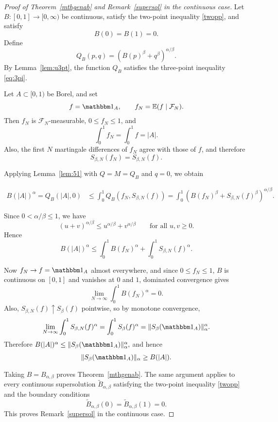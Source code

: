 \documentclass[11pt]{amsart}
\theoremstyle{definition}
\renewcommand{\1}{{\mathbbm{1}}}
\begin{document}
\begin{proof}[Proof of Theorem~\ref{mthgenab} and Remark~\ref{supersol} in the continuous case]
Let $B:[0,1]\to[0,\infty)$ be continuous, satisfy the two-point
inequality \eqref{twopp}, and satisfy
\[
B(0)=B(1)=0.
\]
Define
\[
Q_B(p,q)=\left(B(p)^\beta+q^\beta\right)^{\alpha/\beta}.
\]
By Lemma~\ref{lem:u3pt}, the function $Q_B$ satisfies the three-point
inequality \eqref{eq:3pi}.

Let $A\subset{[0,1)}$ be Borel, and set
\[
f=\mathbbm 1_A,
\qquad
f_N=\mathbb E(f\mid\mathcal F_N).
\]
Then $f_N$ is $\mathcal F_N$-measurable, $0\le f_N\le1$, and
\[
\int_0^1 f_N=\int_0^1 f=|A|.
\]
Also, the first $N$ martingale differences of $f_N$ agree with those of
$f$, and therefore
\[
S_{\beta,N}(f_N)=S_{\beta,N}(f).
\]

Applying Lemma~\ref{lem:51} with $Q=M=Q_B$ and $q=0$, we obtain
\begin{small}
    \begin{align*}
B(|A|)^\alpha
=
Q_B(|A|,0)
&\le
\int_0^1
Q_B\!\left(f_N,S_{\beta,N}(f)\right) =
\int_0^1
\left(B(f_N)^\beta + S_{\beta,N}(f)^\beta\right)^{\alpha/\beta}.
\end{align*}
\end{small}
Since $0<\alpha/\beta\le1$, we have
\[
(u+v)^{\alpha/\beta}\le u^{\alpha/\beta}+v^{\alpha/\beta}
\qquad \text{for all } u,v\ge0.
\]
Hence
\[
B(|A|)^\alpha
\le
\int_0^1 B(f_N)^\alpha
+
\int_0^1 S_{\beta,N}(f)^\alpha.
\]

Now $f_N\to f=\mathbbm 1_A$ almost everywhere, and since $0\le f_N\le1$,
$B$ is continuous on $[0,1]$ and vanishes at $0$ and $1$, dominated
convergence gives
\[
\lim_{N\to\infty}\int_0^1 B(f_N)^\alpha = 0.
\]
Also, $S_{\beta,N}(f)\uparrow S_\beta(f)$ pointwise, so by monotone
convergence,
\[
\lim_{N\to\infty}\int_0^1 S_{\beta,N}(f)^\alpha
=
\int_0^1 S_\beta(f)^\alpha
=
\|S_\beta(\mathbbm 1_A)\|_\alpha^\alpha.
\]
Therefore
$
B(|A|)^\alpha \le \|S_\beta(\mathbbm 1_A)\|_\alpha^\alpha,
$
and hence
\[
\|S_\beta(\mathbbm 1_A)\|_\alpha \ge B(|A|).
\]

Taking $B=B_{\alpha,\beta}$ proves Theorem~\ref{mthgenab}. The same
argument applies to every continuous supersolution
$\widetilde B_{\alpha,\beta}$ satisfying the two-point inequality
\eqref{twopp} and the boundary conditions
\[
\widetilde B_{\alpha,\beta}(0)=\widetilde B_{\alpha,\beta}(1)=0.
\]
This proves Remark~\ref{supersol} in the continuous case.
\end{proof}
\end{document}
